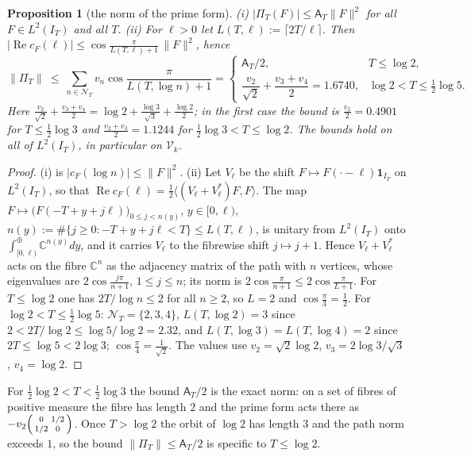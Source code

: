 \documentclass[11pt]{amsart}
\newtheorem{proposition}[theorem]{Proposition}
\theoremstyle{definition}
\theoremstyle{remark}
\newcommand{\C}{\mathbb C}
\newcommand{\Rel}{\operatorname{Re}}
\newcommand{\IT}{I_T}
\newcommand{\cF}{c_F}
\newcommand{\NT}{\mathcal N_T}
\newcommand{\Aconst}{\mathsf A_T}
\newcommand{\PiT}{\Pi_T}
\begin{document}
\begin{proposition}[the norm of the prime form]\label{prop:coer-prime}
\emph{(i)} $|\PiT(F)|\le\Aconst\|F\|^2$ for all $F\in L^2(\IT)$ and all $T$.
\emph{(ii)} For $\ell>0$ let $L(T,\ell):=\lceil2T/\ell\rceil$. Then $|\Rel\cF(\ell)|\le\cos\frac{\pi}{L(T,\ell)+1}\,\|F\|^2$,
hence
\[
\|\PiT\|\ \le\ \sum_{n\in\NT}v_n\cos\frac\pi{L(T,\log n)+1}
=\begin{cases}
\Aconst/2, & T\le\log2,\\[2pt]
\dfrac{v_2}{\sqrt2}+\dfrac{v_3+v_4}2=1.6740, & \log2<T\le\tfrac12\log5 .
\end{cases}
\]
Here $\frac{v_2}{\sqrt2}+\frac{v_3+v_4}2=\log2+\frac{\log3}{\sqrt3}+\frac{\log2}2$; in the first case the bound is
$\frac{v_2}2=0.4901$ for $T\le\frac12\log3$ and $\frac{v_2+v_3}2=1.1244$ for $\frac12\log3<T\le\log2$. The bounds hold on all of $L^2(\IT)$, in particular on $\mathcal V_k$.
\end{proposition}
\begin{proof}
(i) is $|\cF(\log n)|\le\|F\|^2$. (ii) Let $V_\ell$ be the shift $F\mapsto F(\cdot-\ell)\mathbf 1_{\IT}$ on
$L^2(\IT)$, so that $\Rel\cF(\ell)=\frac12\langle(V_\ell+V_\ell^*)F,F\rangle$. The map
$F\mapsto\big(F(-T+y+j\ell)\big)_{0\le j<n(y)}$, $y\in[0,\ell)$, $n(y):=\#\{j\ge0:-T+y+j\ell<T\}\le L(T,\ell)$, is unitary
from $L^2(\IT)$ onto $\int^\oplus_{[0,\ell)}\C^{n(y)}dy$, and it carries $V_\ell$ to the fibrewise shift $j\mapsto j+1$.
Hence $V_\ell+V_\ell^*$ acts on the fibre $\C^{n}$ as the adjacency matrix of the path with $n$ vertices, whose
eigenvalues are $2\cos\frac{j\pi}{n+1}$, $1\le j\le n$; its norm is $2\cos\frac\pi{n+1}\le2\cos\frac\pi{L+1}$. For
$T\le\log2$ one has $2T/\log n\le2$ for all $n\ge2$, so $L=2$ and $\cos\frac\pi3=\frac12$. For $\log2<T\le\frac12\log5$:
$\NT=\{2,3,4\}$, $L(T,\log2)=3$ since $2<2T/\log2\le\log5/\log2=2.32$, and $L(T,\log3)=L(T,\log4)=2$ since
$2T\le\log5<2\log3$; $\cos\frac\pi4=\frac1{\sqrt2}$. The values use $v_2=\sqrt2\log2$, $v_3=2\log3/\sqrt3$, $v_4=\log2$.
\end{proof}
For $\frac12\log2<T<\frac12\log3$ the bound $\Aconst/2$ is the exact norm: on a set of fibres of positive
measure the fibre has length $2$ and the prime form acts there as $-v_2\begin{psmallmatrix}0&1/2\\1/2&0\end{psmallmatrix}$.
Once $T>\log2$ the orbit of $\log2$ has length $3$ and the path norm exceeds $1$, so the bound
$\|\PiT\|\le\Aconst/2$ is specific to $T\le\log2$.
\end{document}
